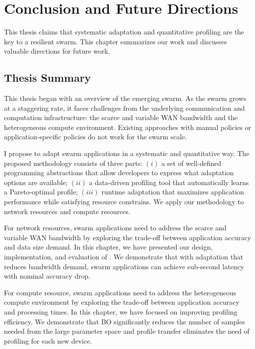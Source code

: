 \documentclass[thesis.tex]{subfiles}
\begin{document}
\chapter{Conclusion and Future Directions}
\label{cha:concl-future-work}

This thesis claims that systematic adaptation and quantitative profiling are the
key to a resilient swarm. This chapter summarizes our work and discusses
valuable directions for future work.

\section{Thesis Summary}
\label{sec:thesis-summary}

This thesis began with an overview of the emerging swarm. As the swarm grows at
a staggering rate, it faces challenges from the underlying communication and
computation infrastructure: the scarce and variable WAN bandwidth and the
heterogeneous compute environment. Existing approaches with manual policies or
application-specific policies do not work for the swarm scale.

I propose to adapt swarm applications in a systematic and quantitative way. The
proposed methodology consists of three parts: $(i)$ a set of well-defined
programming abstractions that allow developers to express what adaptation
options are available; $(ii)$ a data-driven profiling tool that automatically
learns a Pareto-optimal profile; $(iii)$ runtime adaptation that maximizes
application performance while satisfying resource constrains. We apply our
methodology to network resources and compute resources.

For network resources, swarm applications need to address the scarce and
variable WAN bandwidth by exploring the trade-off between application accuracy
and data size demand. In this chapter, we have presented our design,
implementation, and evaluation of \awstream{}. We demonstrate that with
adaptation that reduces bandwidth demand, swarm applications can achieve
sub-second latency with nominal accuracy drop.

For compute resource, swarm applications need to address the heterogeneous
compute environment by exploring the trade-off between application accuracy and
processing times. In this chapter, we have focused on improving profiling
efficiency. We demonstrate that BO significantly reduces the number of samples
needed from the large parameter space and profile transfer eliminates the need
of profiling for each new device.
\end{document}
